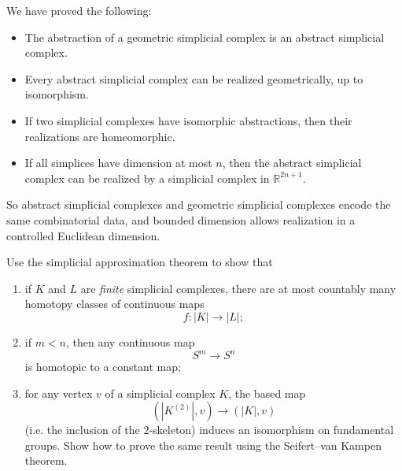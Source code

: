 \begin{solution}
We have proved the following:

\begin{itemize}
	\item The abstraction of a geometric simplicial complex is an abstract simplicial complex.
	\item Every abstract simplicial complex can be realized geometrically, up to isomorphism.
	\item If two simplicial complexes have isomorphic abstractions, then their realizations are homeomorphic.
	\item If all simplices have dimension at most \(n\), then the abstract simplicial complex can be realized by a simplicial complex in \(\mathbb R^{2n+1}\).
\end{itemize}

So abstract simplicial complexes and geometric simplicial complexes encode the same combinatorial data, and bounded dimension allows realization in a controlled Euclidean dimension.
\end{solution}

\begin{problem}
Use the simplicial approximation theorem to show that

\begin{enumerate}
	\item[(i)] if \(K\) and \(L\) are \emph{finite} simplicial complexes, there are at most countably many homotopy classes of continuous maps
	\[
	f:|K|\to |L|;
	\]

	\item[(ii)] if \(m<n\), then any continuous map
	\[
	S^m\to S^n
	\]
	is homotopic to a constant map;

	\item[(iii)] for any vertex \(v\) of a simplicial complex \(K\), the based map
	\[
	(|K^{(2)}|,v)\to (|K|,v)
	\]
	(i.e. the inclusion of the \(2\)-skeleton) induces an isomorphism on fundamental groups. Show how to prove the same result using the Seifert--van Kampen theorem.
\end{enumerate}
\end{problem}

